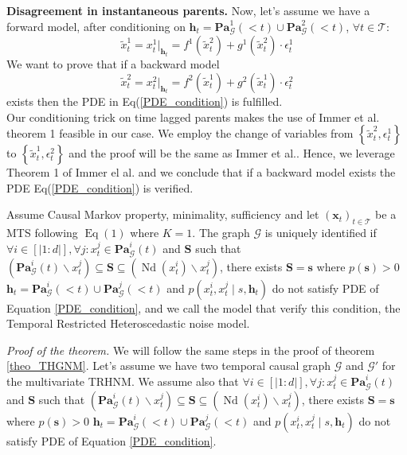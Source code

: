 \textbf{Disagreement in instantaneous parents. }Now, let's assume we have a forward model, after conditioning on $\boldsymbol{h}_t = \mathbf{P a}_{\mathcal{G}}^1(<t) \cup \mathbf{P a}_{\mathcal{G}}^2(<t)$, $\forall t \in \mathcal{T}$:
\begin{equation*}
    \tilde{x}_t^1 = x_t^1|_{\boldsymbol{h}_t}= f^1\left(\tilde{x}_t^2\right)+g^1\left(\tilde{x}_t^2\right)\cdot\epsilon_t^{1}
\end{equation*} 
We want to prove that if a backward model $$\tilde{x}_t^2 = x_t^2|_{\boldsymbol{h}_t}= f^2\left(\tilde{x}_t^1\right)+g^2\left( \tilde{x}_t^1\right)\cdot\epsilon_t^{2}$$ exists then the PDE in Eq(\ref{PDE_condition}) is fulfilled.\\%
Our conditioning trick on time lagged parents makes the use of Immer et al. \citep{immer2023identifiability} theorem 1 feasible in our case. We employ the change of variables from $\left\{\tilde{x}_t^2, \epsilon_t^{1}\right\}$ to $\left\{\tilde{x}_t^1, \epsilon_t^{2}\right\}$ and the proof will be the same as Immer et al.. 
Hence, we leverage Theorem 1 of Immer el al. and we conclude that if a backward model exists the PDE Eq(\ref{PDE_condition}) is verified.
\begin{mybox}
\begin{theorem} Assume Causal Markov property, minimality, sufficiency and let $\left(\boldsymbol{x}_t\right)_{t \in \mathcal{T}}$ be a MTS following $\operatorname{Eq}(1)$ where $K=1$. The graph $\mathcal{G}$ is uniquely identified if $\forall i \in[|1: d|], \forall j: x_t^j \in \mathbf{P a}_{\mathcal{G}}^i(t)$ and $\boldsymbol{S}$ such that $\left(\mathbf{P a}_{\mathcal{G}}^i(t) \backslash x_t^j\right) \subseteq \boldsymbol{S} \subseteq\left(\operatorname{Nd}\left(x_t^i\right) \backslash x_t^j\right)$, there exists $\boldsymbol{S}=\boldsymbol{s}$ where $p(\boldsymbol{s})>0$ $\boldsymbol{h}_t = \mathbf{P a}_{\mathcal{G}}^i(<t) \cup \mathbf{P a}_{\mathcal{G}}^j(<t)$ and $p\left(x_t^i, x_t^j \mid s, \boldsymbol{h}_t\right)$ do not satisfy PDE of Equation \ref{PDE_condition}, and we call the model that verify this condition, the Temporal Restricted Heteroscedastic noise model.
\label{theo_TRHNM}
\end{theorem}
\end{mybox}
\textit{Proof of the theorem. } We will follow the same steps in the proof of theorem \ref{theo_THGNM}. Let's assume we have two temporal causal graph $\mathcal{G}$ and $ \mathcal{G}'$ for the multivariate TRHNM. We assume also that $\forall i \in[|1: d|], \forall j: x_t^j \in \mathbf{P a}_{\mathcal{G}}^i(t)$ and $\boldsymbol{S}$ such that $\left(\mathbf{P a}_{\mathcal{G}}^i(t) \backslash x_t^j\right) \subseteq \boldsymbol{S} \subseteq\left(\operatorname{Nd}\left(x_t^i\right) \backslash x_t^j\right)$, there exists $\boldsymbol{S}=\boldsymbol{s}$ where $p(\boldsymbol{s})>0$ $\boldsymbol{h}_t = \mathbf{P a}_{\mathcal{G}}^i(<t) \cup \mathbf{P a}_{\mathcal{G}}^j(<t)$ and $p\left(x_t^i, x_t^j \mid s, \boldsymbol{h}_t\right)$ do not satisfy PDE of Equation \ref{PDE_condition}.

